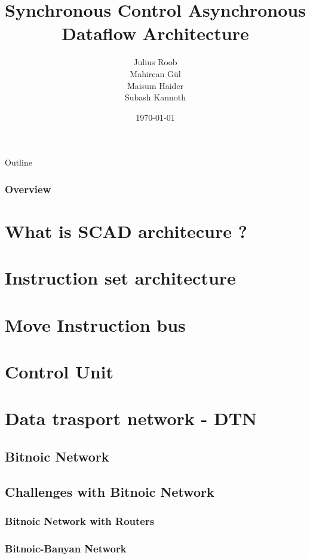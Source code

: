 \documentclass{beamer}
\title[SCAD Architecture]{Synchronous Control Asynchronous Dataflow Architecture}
\author{Julius Roob \\ Mahircan G{\"u}l \\ Maisum Haider \\ Subash Kannoth }
\institute[TU Kaiserslautern]
{
	Technische Universit{\"a}t Kaiserslautern \\
	\medskip
}
\date{\today}
\begin{document}
\begin{frame}
  \titlepage
\end{frame}

\begin{frame}[allowframebreaks]{Outline}
\frametitle{Overview}
\tableofcontents
\end{frame}

\section{What is SCAD architecure ?}
  
  
\section{Instruction set architecture}
  
  
\section{Move Instruction bus}
  
  
\section{Control Unit}
  
  
\section{Data trasport network - DTN}
  
  
  \subsection{Bitnoic Network}
    
    
    
     \subsection{Challenges with Bitnoic Network}
	
	
	\subsubsection{Bitnoic Network with Routers}
	
      
	\subsubsection{Bitnoic-Banyan Network}
	
	
\end{document}
